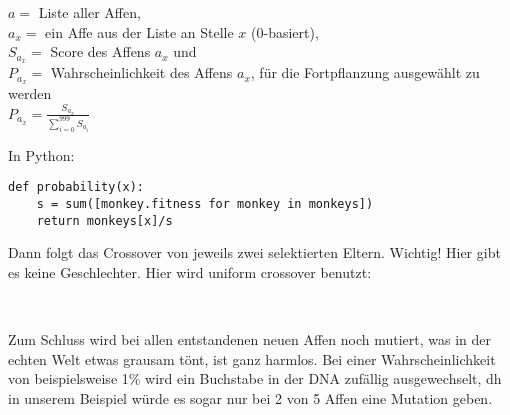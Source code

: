 \documentclass[10pt,a4paper,ngerman,english]{article}
\begin{document}
\begin{addmargin}[2em]{0em}
$ a = $ Liste aller Affen,\\
$ a_x = $ ein Affe aus der Liste an Stelle $x$ (0-basiert),\\
$ S_{a_x} = $ Score des Affens $ a_x $ und \\
$ P_{a_x} = $ Wahrscheinlichkeit des Affens $ a_x $, für die Fortpflanzung ausgewählt zu werden\\

\Large$ P_{a_x} = \frac{S_{a_x}}{\sum_{i=0}^{999} S_{a_i}} $\\
\end{addmargin}

\normalsize
In Python:


\begin{addmargin}[2em]{0em}
\begin{lstlisting}
def probability(x):
    s = sum([monkey.fitness for monkey in monkeys])
    return monkeys[x]/s
\end{lstlisting}
\end{addmargin}

Dann folgt das Crossover von jeweils zwei selektierten Eltern. Wichtig! Hier gibt es keine Geschlechter. Hier wird uniform crossover benutzt:\\

\begin{addmargin}[2em]{0em}
\\
\end{addmargin}

Zum Schluss wird bei allen entstandenen neuen Affen noch mutiert, was in der echten Welt etwas grausam tönt, ist ganz harmlos. Bei einer Wahrscheinlichkeit von beispielsweise 1\% wird ein Buchstabe in der DNA zufällig ausgewechselt, dh in unserem Beispiel würde es sogar nur bei 2 von 5 Affen eine Mutation geben.\\
\end{document}
